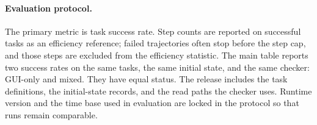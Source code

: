\paragraph{Evaluation protocol.}
The primary metric is task success rate. Step counts are reported on successful tasks as an efficiency reference; failed trajectories often stop before the step cap, and those steps are excluded from the efficiency statistic. The main table reports two success rates on the same tasks, the same initial state, and the same checker: GUI-only and mixed. They have equal status. The release includes the task definitions, the initial-state records, and the read paths the checker uses. Runtime version and the time base used in evaluation are locked in the protocol so that runs remain comparable.
